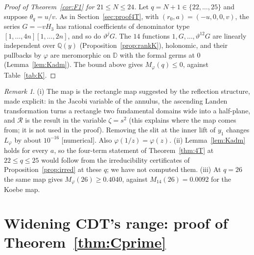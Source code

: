 \documentclass[11pt]{amsart}
\theoremstyle{definition}
\theoremstyle{remark}
\newtheorem{remark}[proposition]{Remark}
\numberwithin{equation}{section}
\newcommand{\QQ}{\mathbb{Q}}
\newcommand{\DD}{\mathbb{D}}
\begin{document}
\begin{proof}[Proof of Theorem~\ref{cor:F1} for $21\le N\le24$]
Let $q=N+1\in\{22,\dots,25\}$ and suppose $\theta_q=u/v$. As in Section~\ref{sec:proof4T}, with $(r_0,a)=(-u,0,0,v)$, the
series $G=-vH_3$ has rational coefficients of denominator type $[1,\dots,4n][1,\dots,2n]$, and so do $\vartheta^jG$. The
$14$ functions $1,G,\dots,\vartheta^{12}G$ are linearly independent over $\QQ(y)$ (Proposition~\ref{prop:rankK}), holonomic,
and their pullbacks by $\varphi$ are meromorphic on $\DD$ with the formal germs at $0$ (Lemma~\ref{lem:Kadm}). The bound
above gives $M_\varphi(q)\le0$, against Table~\ref{tab:K}.
\end{proof}

\begin{remark}\label{rem:Kremarks}
(i) The map is the rectangle map suggested by the reflection structure, made explicit: in the Jacobi variable of the
annulus, the ascending Landen transformation turns a rectangle two fundamental domains wide into a half-plane, and
$\mathcal R$ is the result in the variable $\zeta=s^2$ (this explains where the map comes from; it is not used in the
proof). Removing the slit at the inner lift of $y_1$ changes $L_\varphi$ by about $10^{-16}$ [numerical]. Also
$\varphi(1/z)=\varphi(z)$. (ii) Lemma~\ref{lem:Kadm} holds for every $a$, so the four-term statement of Theorem~\ref{thm:4T} at
$22\le q\le25$ would follow from the irreducibility certificates of Proposition~\ref{prop:irred} at these $q$; we have not
computed them. (iii) At $q=26$ the same map gives $M_\varphi(26)\ge0.4040$, against $M_{14}(26)=0.0092$ for the Koebe
map.
\end{remark}

\section{Widening CDT's range: proof of Theorem~\ref{thm:Cprime}}\label{sec:Cprime}
\end{document}

